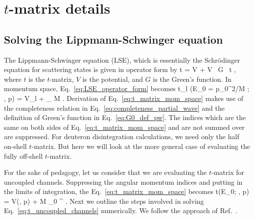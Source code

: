 \cleardoublepage
\chapter{$t$-matrix details}
\label{Appendix:t_matrix_details}

  \section{Solving the Lippmann-Schwinger equation}

  The Lippmann-Schwinger equation (LSE), which is essentially the
  Schr\"{o}dinger equation for scattering states is given in operator form by
  \beq
  t = V + V \, G \, t \;,
  \label{eq:LSE_operator_form}
  \eeq
  where $t$ is the $t$-matrix, $V$ is the potential, and $G$ is the Green's
  function.  In momentum space, Eq.~\eqref{eq:LSE_operator_form} becomes
  \beq
  t_{\lp l} (E_0 \!=\! p_0^2/M ; \pp, p) = V_{\lp l} + \sum_{\lpp}
   M \int {} \;.
  \label{eq:t_matrix_mom_space}
  \eeq
  Derivation of Eq.~\eqref{eq:t_matrix_mom_space} makes use of the completeness
  relation in Eq.~\eqref{eq:completeness_partial_wave} and the definition of
  Green's function in Eq.~\eqref{eq:G0_def_pw}.   The indices which are the
  same on both sides of Eq.~\eqref{eq:t_matrix_mom_space} and are not summed
  over are suppressed.  For deuteron disintegration calculations, we need only
  the half on-shell $t$-matrix.  But here we will look at the more general case
  of evaluating the fully off-shell $t$-matrix.

  For the sake of pedagogy, let us consider that we are evaluating the
  $t$-matrix for uncoupled channels.  Suppressing the angular momentum indices
  and putting in the limits of integration,
  the Eq.~\eqref{eq:t_matrix_mom_space} becomes
  \beq
  t(E_0; \pp, p) = V(\pp, p) +  M \int_0 ^\Lambda
   \;.
  \label{eq:t_uncoupled_channels}
  \eeq
  Next we outline the steps involved in solving
  Eq.~\eqref{eq:t_uncoupled_channels} numerically.  We follow the approach of
  Ref.~\cite{Landau:1989}.

